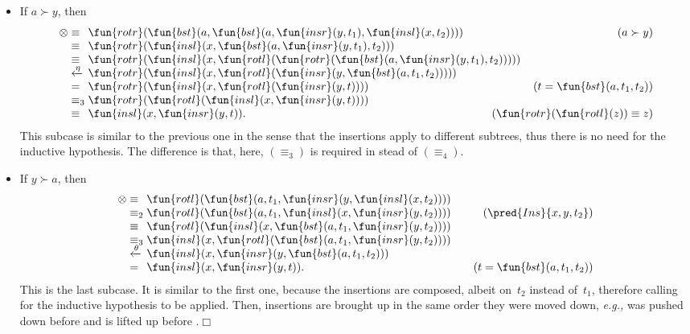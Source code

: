 \begin{itemize}
\begin{itemize}
    \item If \(a \succ y\), then
\begin{equation*}
\begin{array}{@{}r@{\;}l@{\;}l@{\hspace{-9mm}}r@{}}
  \otimes & \equiv & \fun{rotr}(\fun{bst}(a,
  \fun{bst}(a,\fun{insr}(y,t_1),\fun{insl}(x,t_2))))
  & (a \succ y)\\
  & \equiv &
  \fun{rotr}(\fun{insl}(x,\fun{bst}(a,\fun{insr}(y,t_1),t_2)))\\
  & \equiv & \fun{rotr}(\fun{insl}(x,
  \fun{rotl}(\fun{rotr}(\fun{bst}(a,\fun{insr}(y,t_1),t_2)))))\\
  & \xleftarrow{\smash{\eta}} &
  \fun{rotr}(\fun{insl}(x,\fun{rotl}(\fun{insr}(y,
  \fun{bst}(a,t_1,t_2)))))\\
  & = & \fun{rotr}(\fun{insl}(x,\fun{rotl}(\fun{insr}(y,t))))
  & (t=\fun{bst}(a,t_1,t_2))\\
  & \equiv_3 &
  \fun{rotr}(\fun{rotl}(\fun{insl}(x,\fun{insr}(y,t))))\\
  & \equiv & \fun{insl}(x,\fun{insr}(y,t)).
  & (\fun{rotr}(\fun{rotl}(z)) \equiv z)
\end{array}
\end{equation*}
This subcase is similar to the previous one in the sense that the
insertions apply to different subtrees, thus there is no need for the
inductive hypothesis. The difference is that, here, \((\equiv_3)\) is
required in stead of \((\equiv_4)\).

  \item If \(y \succ a\), then
\begin{equation*}
\begin{array}{@{}r@{\;}l@{\;}l@{\qquad}r@{}}
  \otimes & \equiv &
  \fun{rotl}(\fun{bst}(a,t_1,\fun{insr}(y,\fun{insl}(x,t_2))))\\
  & \equiv_2 & \fun{rotl}(\fun{bst}(a,t_1,\fun{insl}(x,
  \fun{insr}(y,t_2)))) & (\pred{Ins}{x,y,t_2})\\
  & \equiv &
  \fun{rotl}(\fun{insl}(x,\fun{bst}(a,t_1,\fun{insr}(y,t_2))))\\
  & \equiv_3 & \fun{insl}(x,\fun{rotl}(\fun{bst}(a,t_1,
  \fun{insr}(y,t_2))))\\
  & \xleftarrow{\smash{\theta}} & \fun{insl}(x,\fun{insr}(y,
  \fun{bst}(a,t_1,t_2)))\\
  & = & \fun{insl}(x,\fun{insr}(y,t)). & (t=\fun{bst}(a,t_1,t_2))
\end{array}
\end{equation*}
This is the last subcase. It is similar to the first one, because the
insertions are composed, albeit on~\(t_2\) instead of~\(t_1\),
therefore calling for the inductive hypothesis to be applied. Then,
insertions are brought up in the same order they were moved down,
\emph{e.g.,}  was pushed down before  and is
lifted up before .\hfill\(\Box\)
  \end{itemize}

\end{itemize}

